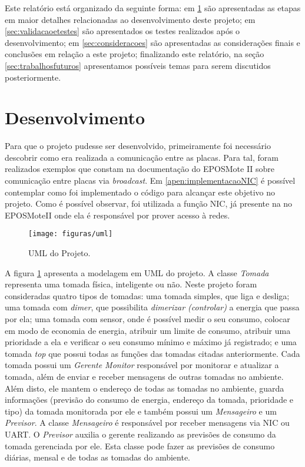 \documentclass[article,11pt,oneside,a4paper,english,brazil]{abntex2}
\begin{document}
	Este relatório está organizado da seguinte forma: em \ref{sec:desenvolvimento} são apresentadas as etapas em maior detalhes relacionadas ao desenvolvimento deste projeto; em \ref{sec:validacaoetestes} são apresentados os testes realizados após o desenvolvimento; em \ref{sec:consideracoes} são apresentadas as considerações finais e conclusões em relação a este projeto; finalizando este relatório, na seção \ref{sec:trabalhosfuturos} apresentamos possíveis temas para serem discutidos posteriormente.
	
\section{Desenvolvimento} \label{sec:desenvolvimento}
	
	Para que o projeto pudesse ser desenvolvido, primeiramente foi necessário descobrir como era realizada a comunicação entre as placas. Para tal, foram realizados exemplos que constam na documentação do EPOSMote II sobre comunicação entre placas via \textit{broadcast}. Em \ref{apen:implementacaoNIC} é possível contemplar como foi implementado o código para alcançar este objetivo no projeto. Como é possível observar, foi utilizada a função NIC, já presente na no EPOSMoteII onde ela é responsável por prover acesso à redes. 
	
	\begin{figure}[h]
		\centering
		\texttt{[image: figuras/uml]}
		\caption[Short]{UML do Projeto.}
		\label{fig:uml}
	\end{figure}
	
	A figura \ref{fig:uml} apresenta a modelagem em UML do projeto. A classe \textit{Tomada} representa uma tomada física, inteligente ou não. Neste projeto foram consideradas quatro tipos de tomadas: uma tomada simples, que liga e desliga; uma tomada com \textit{dimer}, que possibilita \textit{dimerizar (controlar)} a energia que passa por ela; uma tomada com sensor, onde é possível medir o seu consumo, colocar em modo de economia de energia, atribuir um limite de consumo, atribuir uma prioridade a ela e verificar o seu consumo mínimo e máximo já registrado; e uma tomada \textit{top} que possui todas as funções das tomadas citadas anteriormente. Cada tomada possui um \textit{Gerente Monitor} responsável por monitorar e atualizar a tomada, além de enviar e receber mensagens de outras tomadas no ambiente. Além disto, ele mantem o endereço de todas as tomadas no ambiente, guarda informações (previsão do consumo de energia, endereço da tomada, prioridade e tipo) da tomada monitorada por ele e também possui um \textit{Mensageiro} e um \textit{Previsor}. A classe \textit{Mensageiro} é responsável por receber mensagens via NIC ou UART. O \textit{Previsor} auxilia o gerente realizando as previsões de consumo da tomada gerenciada por ele. Esta classe pode fazer as previsões de consumo diárias, mensal e de todas as tomadas do ambiente. 
\end{document}
